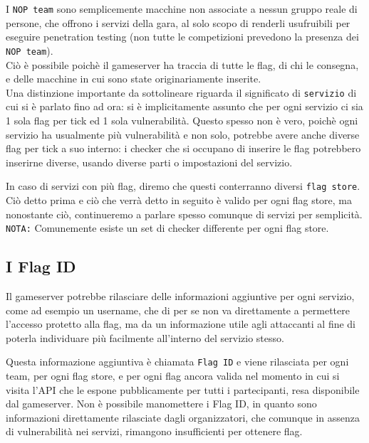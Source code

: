 I \texttt{NOP team} sono semplicemente macchine non associate a nessun gruppo reale di persone, che offrono i servizi della gara, al solo scopo di renderli usufruibili per eseguire penetration testing (non tutte le competizioni prevedono la presenza dei \texttt{NOP team}).\\
Ciò è possibile poichè il gameserver ha traccia di tutte le flag, di chi le consegna, e delle macchine in cui sono state originariamente inserite.\\
Una distinzione importante da sottolineare riguarda il significato di \texttt{servizio} di cui si è parlato fino ad ora: si è implicitamente assunto che per ogni servizio ci sia 1 sola flag per tick ed 1 sola vulnerabilità. Questo spesso non è vero, poichè ogni servizio ha usualmente più vulnerabilità e non solo, potrebbe avere anche diverse flag per tick a suo interno: i checker che si occupano di inserire le flag potrebbero inserirne diverse, usando diverse parti o impostazioni del servizio.

In caso di servizi con più flag, diremo che questi conterranno diversi \texttt{flag store}.\\
Ciò detto prima e ciò che verrà detto in seguito è valido per ogni flag store, ma nonostante ciò, continueremo a parlare spesso comunque di servizi per semplicità.\\
\texttt{NOTA:} Comunemente esiste un set di checker differente per ogni flag store.

\subsection{I Flag ID}

Il gameserver potrebbe rilasciare delle informazioni aggiuntive per ogni servizio, come ad esempio un username, che di per se non va direttamente a permettere l'accesso protetto alla flag, ma da un informazione utile agli attaccanti al fine di poterla individuare più facilmente all'interno del servizio stesso.

Questa informazione aggiuntiva è chiamata \texttt{Flag ID} e viene rilasciata per ogni team, per ogni flag store, e per ogni flag ancora valida nel momento in cui si visita l'API che le espone pubblicamente per tutti i partecipanti, resa disponibile dal gameserver. Non è possibile manomettere i Flag ID, in quanto sono informazioni direttamente rilasciate dagli organizzatori, che comunque in assenza di vulnerabilità nei servizi, rimangono insufficienti per ottenere flag.


